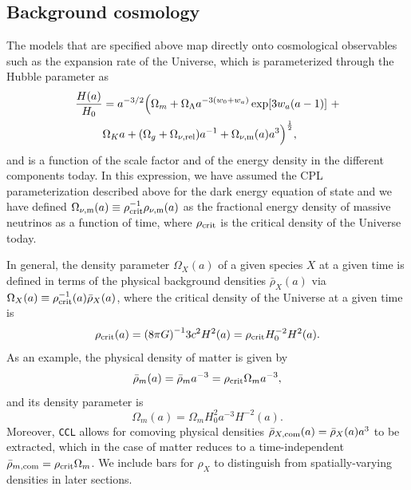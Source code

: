 \documentclass[\docopts]{\docclass}
\newcommand{\ccl}{{\tt CCL}\xspace}
\begin{document}


\subsection{Background cosmology}

The models that are specified above map directly onto cosmological observables such as the expansion rate of the Universe, which is parameterized through the Hubble parameter as
\begin{align}\label{eq:Ha}
\frac{H(a)}{H_0} &= a^{-3/2}\Big(\Omega_{m}+\Omega_{\Lambda} a^{-3(w_0+w_a)}
\exp[3 w_a (a-1)]~+ \nonumber \\ &\Omega_{K} a + (\Omega_{g} + \Omega_{\nu, {\rm rel}}) a^{-1} + \Omega_{\nu, {\rm m}}(a)a^3\Big)^{\frac{1}{2}} ,
\end{align}
and is a function of the scale factor and of the energy density in the different components today. In this expression, we have assumed the CPL parameterization described above for the dark energy equation of state and we have defined $\Omega_{\nu, {\rm m}}(a) \equiv \rho^{-1}_{\rm crit} \rho_{\nu, {\rm m}}(a)$ as the fractional energy density of massive neutrinos as a function of time, where $\rho_{\rm crit}$ is the critical density of the Universe today.

In general, the density parameter $\Omega_X(a)$ of a given species $X$ at a given time is defined in terms of the physical background densities $\bar\rho_X(a)$ via $\Omega_X(a) \equiv \rho^{-1}_{\rm crit}(a) \bar\rho_X(a)$, where the critical density of the Universe at a given time is
\begin{equation}
  \rho_{\rm crit}(a) = {( 8 \pi G)}^{-1} 3c^2H^2(a) = \rho_{\rm crit} H_0^{-2} H^2(a).
  \label{eq:rhocrit}
\end{equation}
As an example, the physical density of matter is given by
\begin{equation}
  \bar\rho_m(a) = \bar\rho_{m} a^{-3} = \rho_{\rm crit} \Omega_{m} a^{-3},
\end{equation}
and its density parameter is
\begin{equation}
  \Omega_m(a) = \Omega_{m} H_0^{2} a^{-3} H^{-2}(a).
\end{equation}
Moreover, \ccl allows for comoving physical densities $\bar\rho_{X, {\rm com}}(a) = \bar\rho_X(a) a^3$ to be extracted, which in the case of matter reduces to a time-independent $\bar\rho_{m, {\rm com}} = \rho_{\rm crit} \Omega_{m}$. We include bars for $\rho_X$ to distinguish from spatially-varying densities in later sections.
\end{document}
